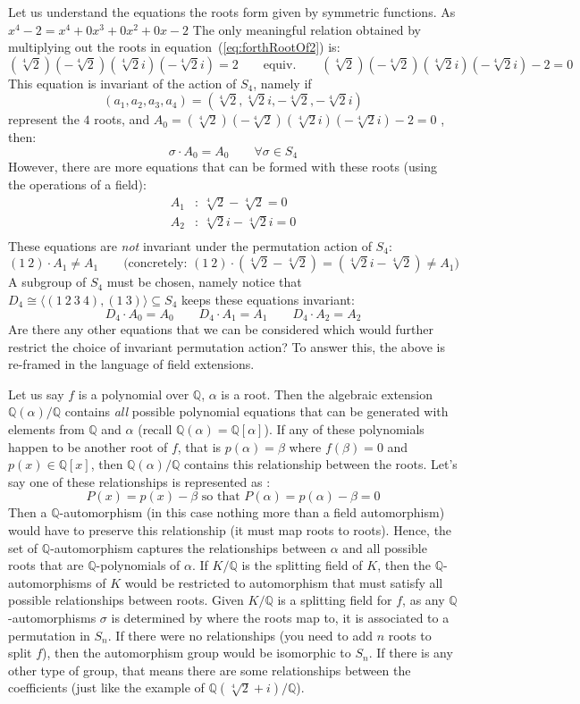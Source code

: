 \documentclass{article}
\newcommand{\Q}{{\mathbb{Q}}}
\newcommand{\sse}{\subseteq}
\begin{document}
Let us understand the equations the roots form given by symmetric functions. As $x^4-2 = x^4 + 0x^3 + 0x^2 + 0x-2$ The only
meaningful relation obtained by multiplying out the roots in equation~(\ref{eq:forthRootOf2}) is:
\[
	(\sqrt[4]{2})(-\sqrt[4]{2})(\sqrt[4]{2}i)(-\sqrt[4]{2}i) = 2 \qquad \text{equiv.} \qquad
	(\sqrt[4]{2})(-\sqrt[4]{2})(\sqrt[4]{2}i)(-\sqrt[4]{2}i)-2 = 0
\]
This equation is invariant of the action of $S_4$, namely if
\[
	(a_1, a_2, a_3, a_4)  = (\sqrt[4]{2}, \sqrt[4]{2}i, -\sqrt[4]{2}, -\sqrt[4]{2}i)
\]
represent the $4$ roots, and $A_0 = (\sqrt[4]{2})(-\sqrt[4]{2})(\sqrt[4]{2}i)(-\sqrt[4]{2}i)-2 = 0$ , then:
\[
	\sigma\cdot A_0 = A_0 \qquad \forall \sigma \in S_4
\]
However, there are more equations that can be formed with these roots (using the operations of a field):
\begin{align*}
	A_1&:\ \sqrt[4]{2} - \sqrt[4]{2}  =0\\
	A_2&:\ \sqrt[4]{2}i - \sqrt[4]{2}i = 0\\
\end{align*}
These equations are \emph{not} invariant under the permutation action of $S_4$:
\[
	(1\ 2)\cdot A_1 \ne A_1 \qquad \text{(concretely: $(1\ 2) \cdot (\sqrt[4]{2} - \sqrt[4]{2})
	= (\sqrt[4]{2}i - \sqrt[4]{2}) \ne A_1$)}
\]
A subgroup of $S_4$ must be chosen, namely notice that $D_4 \cong \langle (1\ 2\ 3\ 4), (1\ 3) \rangle \sse
S_4$ keeps these equations invariant:
\[
	D_4\cdot A_0 = A_0\qquad D_4 \cdot A_1 = A_1 \qquad D_4 \cdot A_2 = A_2
\]
Are there any other equations that we can be considered which would further restrict the choice of invariant
permutation action? To answer this, the above is re-framed in the language of field extensions.

Let us say $f$ is a polynomial over $\Q$, $\alpha$ is
a root. Then the algebraic extension $\Q(\alpha)/\Q$ contains \emph{all} possible polynomial equations that can be
generated with elements from $\Q$ and $\alpha$ (recall $\Q(\alpha) = \Q[\alpha]$). If any of these polynomials happen to be another
root of $f$, that is $p(\alpha) = \beta$ where $f(\beta) = 0$ and $p(x) \in \Q[x]$, then $\Q(\alpha)/\Q$ contains
this relationship between the roots. Let's say one of these relationships is represented as :
\[
	P(x) = p(x) - \beta \text{ so that } P(\alpha) = p(\alpha)-\beta = 0
\]
Then a $\Q$-automorphism (in this case nothing more than a field automorphism) would have to preserve this
relationship (it must map roots to roots). Hence, the set of $\Q$-automorphism captures the relationships
between $\alpha$ and all possible roots that are $\Q$-polynomials of $\alpha$. If $K/\Q$ is the splitting
field of $K$, then the $\Q$-automorphisms of $K$ would be restricted to automorphism that must satisfy all
possible relationships between roots. Given $K/\Q$ is a splitting field for $f$, as any $\Q$-automorphisms
$\sigma$ is determined by where the roots map to, it is associated to a permutation in $S_n$. If there were no
relationships (you need to add $n$ roots to split $f$), then the automorphism group would be isomorphic to
$S_n$. If there is any other type of group, that means there are some relationships between the coefficients
(just like the example of $\Q(\sqrt[4]{2} + i)/\Q$).
\end{document}
